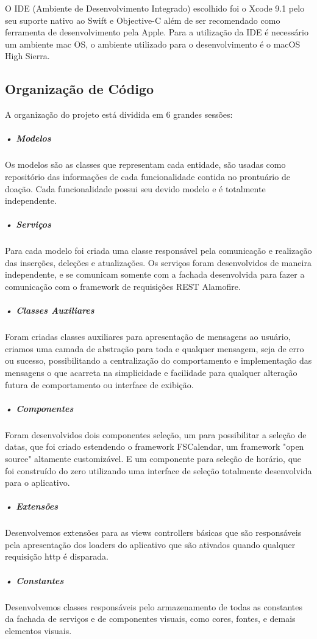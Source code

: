 \documentclass[portuguese,oneside]{tcc}
\begin{document}
O IDE (Ambiente de Desenvolvimento Integrado) escolhido foi o Xcode 9.1 pelo seu suporte nativo ao Swift e Objective-C além de ser recomendado como ferramenta de desenvolvimento pela Apple. Para a utilização da IDE é necessário um ambiente mac OS, o ambiente utilizado para o desenvolvimento é o macOS High Sierra.

\subsection{Organização de Código}
A organização do projeto está dividida em 6 grandes sessões: 

\subparagraph{• Modelos}
Os modelos são as classes que representam cada entidade, são usadas como repositório das informações de cada funcionalidade contida no prontuário de doação. Cada funcionalidade possui seu devido modelo e é totalmente independente.

\subparagraph{• Serviços}
Para cada modelo foi criada uma classe responsável pela comunicação e realização das inserções, deleções e atualizações. Os serviços foram desenvolvidos de maneira independente, e se comunicam somente com a fachada desenvolvida para fazer a comunicação com o framework de requisições REST Alamofire.

\subparagraph{• Classes Auxiliares}
Foram criadas classes auxiliares para apresentação de mensagens ao usuário, criamos uma camada de abstração para toda e qualquer mensagem, seja de erro ou sucesso, possibilitando a centralização do comportamento e implementação das mensagens o que acarreta na simplicidade e facilidade para qualquer alteração futura de comportamento ou interface de exibição.

\subparagraph{• Componentes}
Foram desenvolvidos dois componentes seleção, um para possibilitar a seleção de datas, que foi criado estendendo o framework FSCalendar, um framework "open source" altamente customizável. E um componente para seleção de horário, que foi construído do zero utilizando uma interface de seleção totalmente desenvolvida para o aplicativo.

\subparagraph{• Extensões}
Desenvolvemos extensões para as views controllers básicas que são responsáveis pela apresentação dos loaders do aplicativo que são ativados quando qualquer requisição http é disparada.

\subparagraph{• Constantes}
Desenvolvemos classes responsáveis pelo armazenamento de todas as constantes da fachada de serviços e de componentes visuais, como cores, fontes, e demais elementos visuais.
\end{document}
